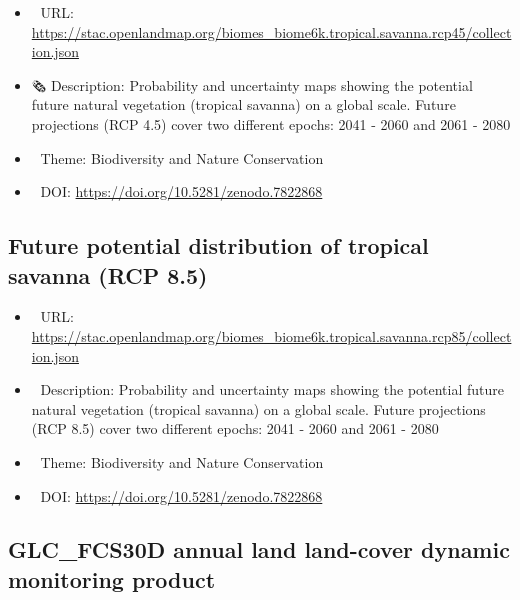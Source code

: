 \documentclass[
  graybox,natbib,nospthms]{svmono}
\providecommand{\tightlist}{%
  \setlength{\itemsep}{0pt}\setlength{\parskip}{0pt}}
\providecommand{\tightlist}{\setlength{\itemsep}{0pt}\setlength{\parskip}{0pt}}
\begin{document}
\begin{itemize}
\tightlist
\item
  🔗 URL: \url{https://stac.openlandmap.org/biomes_biome6k.tropical.savanna.rcp45/collection.json}
\item
  🗞 Description: Probability and uncertainty maps showing the potential future natural vegetation (tropical savanna) on a global scale. Future projections (RCP 4.5) cover two different epochs: 2041 - 2060 and 2061 - 2080
\item
  📝 Theme: Biodiversity and Nature Conservation
\item
  📂 DOI: \url{https://doi.org/10.5281/zenodo.7822868}
\end{itemize}

\hypertarget{future-potential-distribution-of-tropical-savanna-rcp-8.5}{%
\subsection{Future potential distribution of tropical savanna (RCP 8.5)}\label{future-potential-distribution-of-tropical-savanna-rcp-8.5}}

\begin{itemize}
\tightlist
\item
  🔗 URL: \url{https://stac.openlandmap.org/biomes_biome6k.tropical.savanna.rcp85/collection.json}
\item
  📰 Description: Probability and uncertainty maps showing the potential future natural vegetation (tropical savanna) on a global scale. Future projections (RCP 8.5) cover two different epochs: 2041 - 2060 and 2061 - 2080
\item
  📝 Theme: Biodiversity and Nature Conservation
\item
  📂 DOI: \url{https://doi.org/10.5281/zenodo.7822868}
\end{itemize}

\hypertarget{glc_fcs30d-annual-land-land-cover-dynamic-monitoring-product}{%
\subsection{GLC\_FCS30D annual land land-cover dynamic monitoring product}\label{glc_fcs30d-annual-land-land-cover-dynamic-monitoring-product}}
\end{document}
